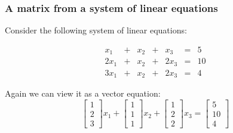\begin{frame}
  \frametitle{A matrix from a system of linear equations}
  Consider the following system of linear equations:

  \[
  \begin{array}{ccccccr}
    x_1 &+& x_2 &+& x_3 &=& 5\\
    2x_1 &+& x_2 &+& 2x_3 &=& 10\\
    3x_1 &+& x_2 &+& 2x_3 &=& 4
  \end{array}
  \]
  \pause

  Again we can view it as a vector equation:
  \[
  \begin{bmatrix}
    1\\
    2\\
    3
  \end{bmatrix}
  x_1 +
  \begin{bmatrix}
    1\\
    1\\
    1
  \end{bmatrix}
  x_2 +
  \begin{bmatrix}
    1\\
    2\\
    2
  \end{bmatrix}
  x_3
  =
  \begin{bmatrix}
    5\\
    10\\
    4
  \end{bmatrix}
  \]
\end{frame}

